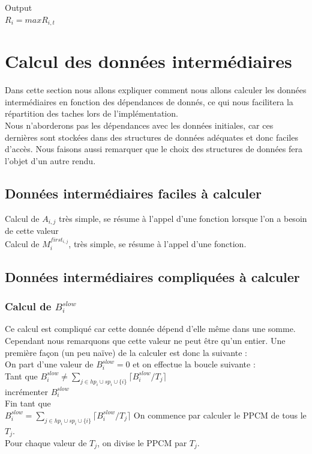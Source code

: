 \documentclass[10pt,a4paper]{article}
\begin{document}
Output\\
$R_{i} = max R_{i,t}$\\



\section{Calcul des données intermédiaires}
Dans cette section nous allons expliquer comment nous allons calculer les données 
intermédiaires en fonction des dépendances de donnés, ce qui nous facilitera la répartition 
des taches lors de l'implémentation.\\
Nous n'aborderons pas les dépendances avec les données initiales, car ces dernières sont stockées 
dans des structures de données adéquates et donc faciles d'accès.
Nous faisons aussi remarquer que le choix des structures de données fera 
l'objet d'un autre rendu.

\subsection{Données intermédiaires faciles à calculer}
Calcul de $A_{i,j}$ très simple, se résume à l'appel d'une fonction lorsque l'on a besoin de 
cette valeur\\
Calcul de $M_{i}^{first_{i,j}}$, très simple, se résume à l'appel d'une fonction.

\subsection{Données intermédiaires compliquées à calculer}

\subsubsection{Calcul de $B_i^{slow}$}
Ce calcul est compliqué car cette donnée dépend d'elle même dans une somme. Cependant 
nous remarquons que cette valeur ne peut être qu'un entier. Une première façon (un peu naïve) 
de la calculer est donc la suivante :\\
\linebreak
On part d'une valeur de $B_i^{slow} = 0$ et on effectue la boucle suivante :\\
Tant que $B_i^{slow} \neq \sum \limits _{j \in hp_i \cup sp_i \cup \{i\}} 
\lceil B_i^{slow}/T_ j\rceil$\\
\hspace{4em} incrémenter $B_i^{slow}$\\
Fin tant que\\
\linebreak
$B_i^{slow} = \sum \limits _{j \in hp_i \cup sp_i \cup \{i\}} 
\lceil B_i^{slow}/T_ j\rceil$
On commence par calculer le PPCM de tous le $T_j$.\\
Pour chaque valeur de $T_j$, on divise le PPCM par $T_j$.
\end{document}
